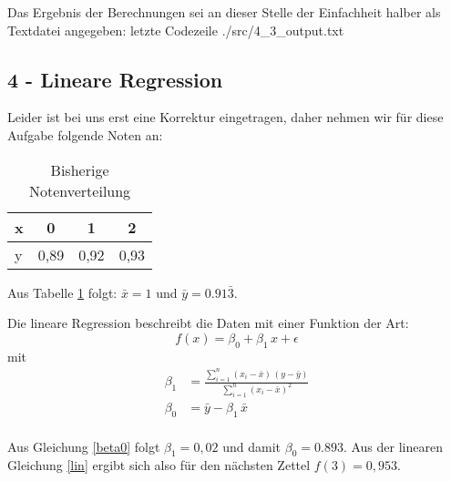Das Ergebnis der Berechnungen sei an dieser Stelle der Einfachheit halber als Textdatei angegeben:
 letzte Codezeile
{./src/4_3_output.txt}

\subsection*{4 - Lineare Regression}
Leider ist bei uns erst eine Korrektur eingetragen, daher nehmen wir für diese Aufgabe folgende Noten an:
\begin{table}[h]
\centering
\caption{Bisherige Notenverteilung}
\begin{tabular}{l | c c c}
x & 0 & 1 & 2 \\ \hline
y & 0,89 & 0,92 & 0,93 \\
\end{tabular}
\label{noten}
\end{table}

Aus Tabelle \ref{noten} folgt: $\bar{x} = 1$ und $\bar{y} = 0.91\bar{3}$.

Die lineare Regression beschreibt die Daten mit einer Funktion der Art:
\begin{equation}
f(x) = \beta _0 + \beta _1 \, x + \epsilon
\label{lin}
\end{equation}
mit
\begin{align}
\beta _1 & = \frac{\sum \limits_{i=1}^n (x_i - \bar{x}) \, (y - \bar{y})}{\sum \limits_{i=1}^n (x_i - \bar{x})^2} \label{beta0}\\
\beta _0 & = \bar{y} - \beta _1 \, \bar{x} \label{beta1}\\
\end{align}

Aus Gleichung \ref{beta0} folgt $\beta _1 = 0,02$ und damit $\beta _0 = 0.893$.
Aus der linearen Gleichung \ref{lin} ergibt sich also für den nächsten Zettel $f(3) = 0,953$.
\printbibliography %


